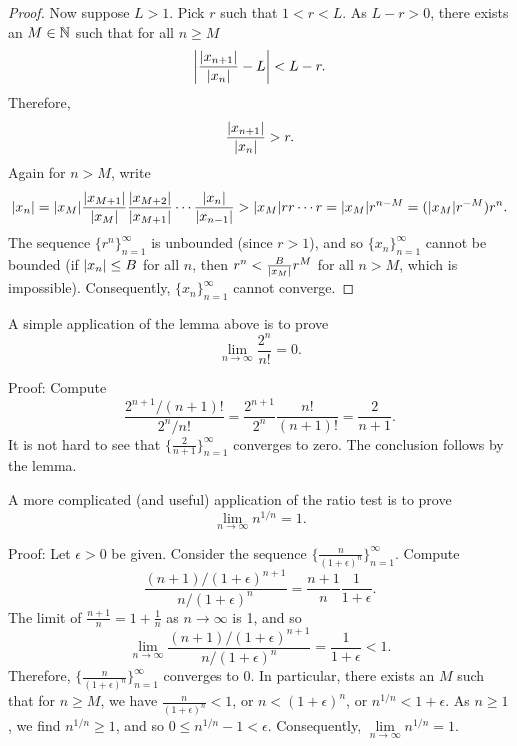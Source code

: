 \begin{proof}
Now suppose $L > 1$.  Pick
$r$ such that $1 < r < L$.  As $L-r > 0$,
there exists an $M \in {\mathbb{N}}$ such that for
all $n \geq M$
\begin{equation*}
\left\lvert {\frac{\lvert {x_{n+1}} \rvert}{\lvert {x_n} \rvert} - L} \right\rvert < L-r .
\end{equation*}
Therefore,
\begin{equation*}
\frac{\lvert {x_{n+1}} \rvert}{\lvert {x_n} \rvert} > r .
\end{equation*}
Again for $n > M$,
write
\begin{equation*}
\lvert {x_n} \rvert =
\lvert {x_M} \rvert
\frac{\lvert {x_{M+1}} \rvert}{\lvert {x_{M}} \rvert}
\frac{\lvert {x_{M+2}} \rvert}{\lvert {x_{M+1}} \rvert}
\cdots
\frac{\lvert {x_{n}} \rvert}{\lvert {x_{n-1}} \rvert}
>
\lvert {x_M} \rvert
r r \cdots r = \lvert {x_M} \rvert r^{n-M} = (\lvert {x_M} \rvert r^{-M}) r^n .
\end{equation*}
The sequence $\{ r^n \}_{n=1}^\infty$ is unbounded (since $r > 1$), and so
$\{x_n\}_{n=1}^\infty$ cannot be bounded (if $\lvert {x_n} \rvert \leq B$ for all $n$, then
$r^n < \frac{B}{\lvert {x_M} \rvert} r^{M}$ for all $n > M$, which is impossible).
Consequently, $\{ x_n \}_{n=1}^\infty$ cannot converge.
\end{proof}

\begin{example}
A simple application of the lemma above is to prove 
\begin{equation*}
\lim_{n\to\infty} \frac{2^n}{n!} = 0 .
\end{equation*}

Proof:
Compute
\begin{equation*}
\frac{2^{n+1} / (n+1)!}{2^n/n!}
=
\frac{2^{n+1}}{2^n}\frac{n!}{(n+1)!}
=
\frac{2}{n+1} .
\end{equation*}
It is not hard to see that $\bigl\{ \frac{2}{n+1} \bigr\}_{n=1}^\infty$ converges to zero.
The conclusion follows by the lemma.
\end{example}

\begin{example} \label{example:nto1overn}
A more complicated (and useful) application of the ratio test is to prove 
\begin{equation*}
\lim_{n\to\infty} n^{1/n} = 1 .
\end{equation*}

Proof:
Let $\epsilon > 0$ be given.  Consider the sequence
$\bigl\{ \frac{n}{{(1+\epsilon)}^n} \bigr\}_{n=1}^\infty$.  Compute
\begin{equation*}
\frac{(n+1)/{(1+\epsilon)}^{n+1}}{n/{(1+\epsilon)}^{n}}
=
\frac{n+1}{n} \frac{1}{1+\epsilon} .
\end{equation*}
The limit of $\frac{n+1}{n} = 1+\frac{1}{n}$ as $n \to \infty$ is 1, and so
\begin{equation*}
\lim_{n\to \infty} \frac{(n+1)/{(1+\epsilon)}^{n+1}}{n/{(1+\epsilon)}^{n}}
=
\frac{1}{1+\epsilon}  < 1 .
\end{equation*}
Therefore, $\bigl\{ \frac{n}{{(1+\epsilon)}^n} \bigr\}_{n=1}^\infty$ converges to 0.
In particular,
there exists an $M$ such that for $n \geq M$, we have
$\frac{n}{{(1+\epsilon)}^n} < 1$, or 
$n < {(1+\epsilon)}^n$, or 
$n^{1/n} < 1+\epsilon$.  As $n \geq 1$, we find $n^{1/n} \geq 1$, and
so $0 \leq n^{1/n}-1 < \epsilon$. Consequently,
$\lim\limits_{n\to\infty} n^{1/n} = 1$.
\end{example}

